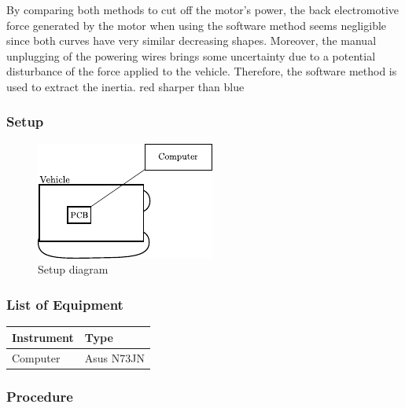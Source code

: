 By comparing both methods to cut off the motor's power, the back electromotive force generated by the motor when using the software method seems negligible since both curves have very similar decreasing shapes. Moreover, the manual unplugging of the powering wires brings some uncertainty due to a potential disturbance of the force applied to the vehicle.
Therefore, the software method is used to extract the inertia.
red sharper than blue

\subsubsection{Setup}
\begin{figure}[H]
	\centering
	\includegraphics[scale=1.6]{figures/inertiaTestSetupDiagram2.pdf}
	\caption{Setup diagram}
	\label{inertiaTestSetupDiagram}
\end{figure}

\subsubsection{List of Equipment}

\begin{table}[H]
\begin{tabular}{|p{10cm}|p{4cm}|}
\hline%
  \textbf{Instrument}                     &  \textbf{Type}       \\
\hline%
  Computer                                &  Asus N73JN    \\
\hline %
\end{tabular}
\end{table}

\subsubsection{Procedure}

